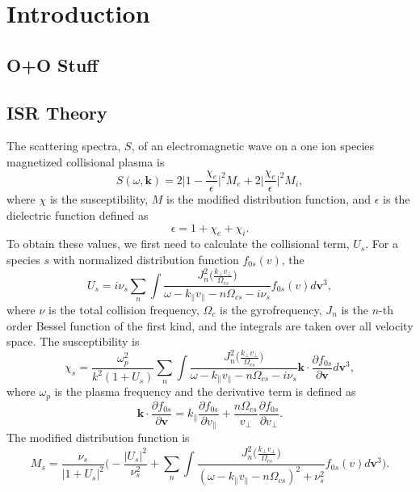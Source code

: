 \chapter{Introduction}

\section{O+O Stuff}




\section{ISR Theory}
\label{s:ISR-spectra}
The scattering spectra, $S$, of an electromagnetic wave on a one ion species magnetized collisional plasma is
\begin{equation}
	S(\omega,\mathbf{k}) = 2 \Big| 1 - \frac{\chi_e}{\epsilon}\Big|^2 M_e
	+ 2\Big|\frac{\chi_e}{\epsilon}\Big|^2 M_i,
	\label{eq:scattering-spectra}
\end{equation}
where $\chi$ is the susceptibility, 
$M$ is the modified distribution function,
and $\epsilon$ is the dielectric function defined as
\begin{equation}
	\epsilon = 1 + \chi_e + \chi_i.
	\label{eq:dielectric}
\end{equation}
To obtain these values, we first need to calculate the collisional term, $U_s$. %
For a species $s$ with normalized distribution function $f_{0s}(v)$, the 
\begin{equation}
	U_s = i \nu_s \sum_n \int 
	\frac{J_n^2\Big( \tfrac{k_\perp v_\perp}{\Omega_{cs}} \Big)}
	{\omega - k_\parallel v_\parallel - n\Omega_{cs} - i\nu_s}  
	f_{0s}(v)   d\mathbf{v}^3 ,
	\label{eq:Us}
\end{equation}
where $\nu$ is the total collision frequency,
$\Omega_{c}$ is the gyrofrequency,
$J_n$ is the $n$-th order Bessel function of the first kind,
and the integrals are taken over all velocity space.
The susceptibility is
\begin{equation}
	\chi_s = \frac{\omega_p^2}{k^2(1+U_s)} \sum_n \int 
	\frac{J_n^2\Big( \tfrac{k_\perp v_\perp}{\Omega_{cs}} \Big)}
	{\omega - k_\parallel v_\parallel - n\Omega_{cs} - i\nu_s}  
	\mathbf{k} \cdot \frac{\partial f_{0s}}{\partial \mathbf{v}}   d\mathbf{v}^3 ,
	\label{eq:chis}
\end{equation} 
where $\omega_p$ is the plasma frequency
and the derivative term is defined as
\begin{equation}
	\mathbf{k} \cdot \frac{\partial f_{0s}}{\partial \mathbf{v}} = 
	k_\parallel \frac{\partial f_{0s}}{\partial v_\parallel}
	+ \frac{n \Omega_{cs}}{v_\perp} \frac{\partial f_{0s}}{\partial v_\perp}.
	\label{eq:chis_derivative}
\end{equation}
The modified distribution function is 
\begin{equation}
	M_s = \frac{\nu_s}{|1+U_s|^2}
	\Bigg( - \frac{|U_s|^2}{\nu_s^2} 
	+ \sum_n \int 
	\frac{J_n^2\Big( \tfrac{k_\perp v_\perp}{\Omega_{cs}} \Big)}
	{(\omega - k_\parallel v_\parallel - n\Omega_{cs})^2 + \nu_s^2}
	f_{0s}(v)   d\mathbf{v}^3 \Bigg).
	\label{eq:Ms}
\end{equation}

